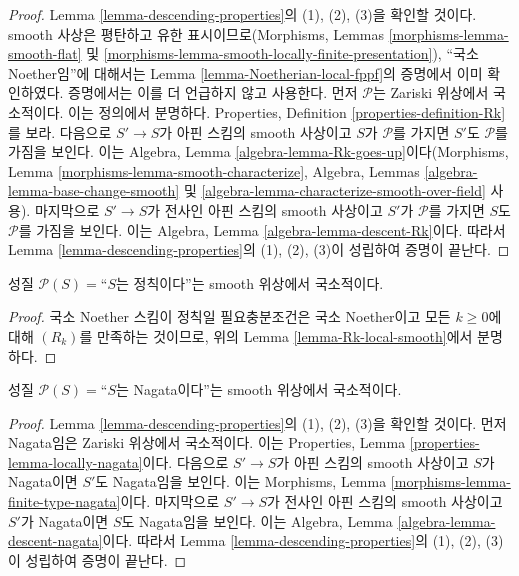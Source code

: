 \begin{proof}
Lemma \ref{lemma-descending-properties}의 (1), (2), (3)을 확인할 것이다.
smooth 사상은 평탄하고 유한 표시이므로(Morphisms, Lemmas
\ref{morphisms-lemma-smooth-flat} 및
\ref{morphisms-lemma-smooth-locally-finite-presentation}), ``국소
Noether임''에 대해서는 Lemma \ref{lemma-Noetherian-local-fppf}의 증명에서
이미 확인하였다. 증명에서는 이를 더 언급하지 않고 사용한다. 먼저
$\mathcal{P}$는 Zariski 위상에서 국소적이다. 이는 정의에서 분명하다.
Properties, Definition \ref{properties-definition-Rk}를 보라. 다음으로
$S' \to S$가 아핀 스킴의 smooth 사상이고 $S$가 $\mathcal{P}$를 가지면
$S'$도 $\mathcal{P}$를 가짐을 보인다. 이는 Algebra, Lemma
\ref{algebra-lemma-Rk-goes-up}이다(Morphisms, Lemma
\ref{morphisms-lemma-smooth-characterize}, Algebra, Lemmas
\ref{algebra-lemma-base-change-smooth} 및
\ref{algebra-lemma-characterize-smooth-over-field} 사용). 마지막으로
$S' \to S$가 전사인 아핀 스킴의 smooth 사상이고 $S'$가 $\mathcal{P}$를
가지면 $S$도 $\mathcal{P}$를 가짐을 보인다. 이는 Algebra, Lemma
\ref{algebra-lemma-descent-Rk}이다. 따라서 Lemma
\ref{lemma-descending-properties}의 (1), (2), (3)이 성립하여 증명이 끝난다.
\end{proof}

\begin{lemma}
\label{lemma-regular-local-smooth}
성질 $\mathcal{P}(S) =$``$S$는 정칙이다''는 smooth 위상에서 국소적이다.
\end{lemma}

\begin{proof}
국소 Noether 스킴이 정칙일 필요충분조건은 국소 Noether이고 모든
$k \geq 0$에 대해 $(R_k)$를 만족하는 것이므로, 위의 Lemma
\ref{lemma-Rk-local-smooth}에서 분명하다.
\end{proof}

\begin{lemma}
\label{lemma-Nagata-local-smooth}
성질 $\mathcal{P}(S) =$``$S$는 Nagata이다''는 smooth 위상에서 국소적이다.
\end{lemma}

\begin{proof}
Lemma \ref{lemma-descending-properties}의 (1), (2), (3)을 확인할 것이다.
먼저 Nagata임은 Zariski 위상에서 국소적이다. 이는 Properties, Lemma
\ref{properties-lemma-locally-nagata}이다. 다음으로 $S' \to S$가 아핀
스킴의 smooth 사상이고 $S$가 Nagata이면 $S'$도 Nagata임을 보인다. 이는
Morphisms, Lemma \ref{morphisms-lemma-finite-type-nagata}이다. 마지막으로
$S' \to S$가 전사인 아핀 스킴의 smooth 사상이고 $S'$가 Nagata이면
$S$도 Nagata임을 보인다. 이는 Algebra, Lemma
\ref{algebra-lemma-descent-nagata}이다. 따라서 Lemma
\ref{lemma-descending-properties}의 (1), (2), (3)이 성립하여 증명이 끝난다.
\end{proof}





